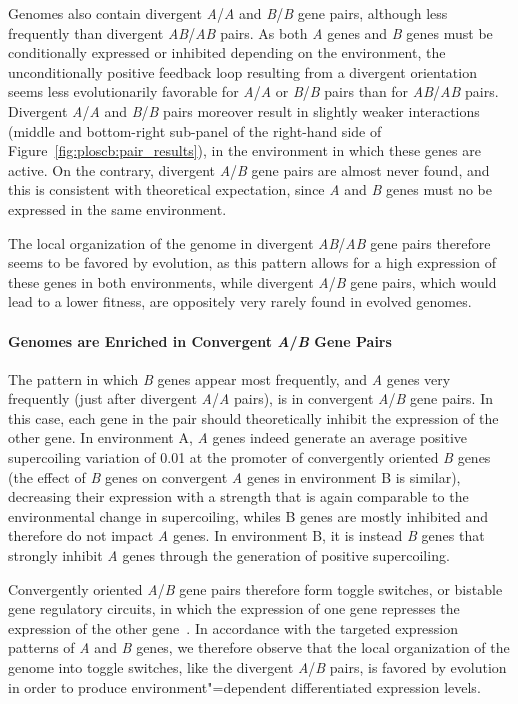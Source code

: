 Genomes also contain divergent \emph{A}/\emph{A} and \emph{B}/\emph{B} gene pairs, although less frequently than divergent \emph{AB}/\emph{AB} pairs.
As both \emph{A} genes and \emph{B} genes must be conditionally expressed or inhibited depending on the environment, the unconditionally positive feedback loop resulting from a divergent orientation seems less evolutionarily favorable for \emph{A}/\emph{A} or \emph{B}/\emph{B} pairs than for \emph{AB}/\emph{AB} pairs.
Divergent \emph{A}/\emph{A} and \emph{B}/\emph{B} pairs moreover result in slightly weaker interactions (middle and bottom-right sub-panel of the right-hand side of Figure~\ref{fig:ploscb:pair_results}), in the environment in which these genes are active.
On the contrary, divergent \emph{A}/\emph{B} gene pairs are almost never found, and this is consistent with theoretical expectation, since \emph{A} and \emph{B} genes must no be expressed in the same environment.

The local organization of the genome in divergent \emph{AB}/\emph{AB} gene pairs therefore seems to be favored by evolution, as this pattern allows for a high expression of these genes in both environments, while divergent \emph{A}/\emph{B} gene pairs, which would lead to a lower fitness, are oppositely very rarely found in evolved genomes.

\paragraph{Genomes are Enriched in Convergent \emph{A}/\emph{B} Gene Pairs}
The pattern in which \emph{B} genes appear most frequently, and \emph{A} genes very frequently (just after divergent \emph{A}/\emph{A} pairs), is in convergent \emph{A}/\emph{B} gene pairs.
In this case, each gene in the pair should theoretically inhibit the expression of the other gene.
In environment A, \emph{A} genes indeed generate an average positive supercoiling variation of 0.01 at the promoter of convergently oriented \emph{B} genes (the effect of \emph{B} genes on convergent \emph{A} genes in environment B is similar), decreasing their expression with a strength that is again comparable to the environmental change in supercoiling, whiles B genes are mostly inhibited and therefore do not impact \emph{A} genes.
In environment B, it is instead \emph{B} genes that strongly inhibit \emph{A} genes through the generation of positive supercoiling.

Convergently oriented \emph{A}/\emph{B} gene pairs therefore form toggle switches, or bistable gene regulatory circuits, in which the expression of one gene represses the expression of the other gene~\citep{gardner2000}.
In accordance with the targeted expression patterns of \emph{A} and \emph{B} genes, we therefore observe that the local organization of the genome into toggle switches, like the divergent \emph{A}/\emph{B} pairs, is favored by evolution in order to produce environment"=dependent differentiated expression levels.


